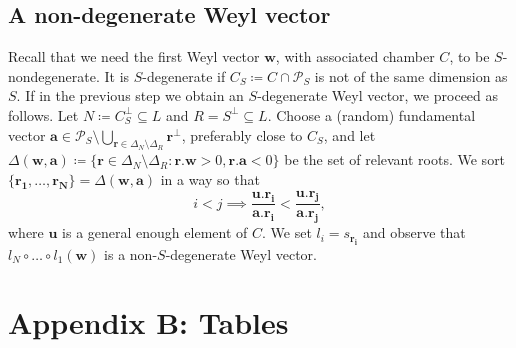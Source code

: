 \documentclass[11pt,letterpaper]{amsart}
\newcommand{\vect}[1]{\boldsymbol{#1}}
\begin{document}
\subsection{A non-degenerate Weyl vector}
Recall that we need the first Weyl vector $\vect{w}$, with associated chamber $C$, to be $S$-nondegenerate. 
It is $S$-degenerate if $C_S \coloneqq  C \cap \mathcal{P}_S$ is not of the same dimension as $S$. If in the previous step we obtain an $S$-degenerate Weyl vector, we proceed as follows.
Let $N\coloneqq  C_S^\perp \subseteq L$ and $R = S^\perp \subseteq L$.
Choose a (random) fundamental vector $\vect{a} \in \mathcal{P}_S\setminus \bigcup_{\vect{r} \in \Delta_N\setminus \Delta_R} \vect{r}^\perp$, preferably close to $C_S$, and let $\Delta(\vect{w},\vect{a})\coloneqq \{\vect{r} \in \Delta_N \setminus \Delta_R : \vect{r}.\vect{w}>0 , \vect{r}.\vect{a}<0\}$ be the set of relevant roots. 
We sort $\{\vect{r_1},\dots, \vect{r_N}\}=\Delta(\vect{w},\vect{a})$ in a way so that 
\[i<j \implies \frac{\vect{u}.\vect{r_i}}{ \vect{a}.\vect{r_i}} < \frac{\vect{u}.\vect{r_j} }{ \vect{a}.\vect{r_j}},\]
where $\vect{u}$ is a general enough element of $C$. We set $l_i = s_{\vect{r_i}}$ and observe that $l_N \circ \ldots \circ l_1 (\vect{w})$ is a non-$S$-degenerate Weyl vector.

\clearpage

\section{Appendix B: Tables}

\small
\end{document}
